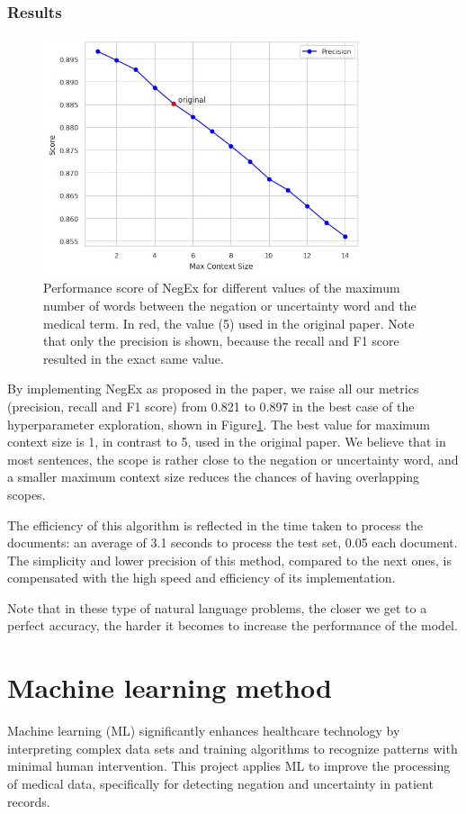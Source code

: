 \documentclass{article}
\begin{document}
\subsubsection*{Results}

\begin{figure}[!t]
	\centering
	\includegraphics[height=7cm]{images/negex_context_size.jpg}
	\captionsetup{width=0.9\textwidth}
	\caption{Performance score of NegEx for different values of the maximum number of words between the negation
	or uncertainty word and the medical term. In red, the value (5) used in the original paper. Note that only
	the precision is shown, because the recall and F1 score resulted in the exact same value.}
	\label{fig:negex_context_size}
\end{figure}

By implementing NegEx as proposed in the paper, we raise all our metrics (precision, recall and F1 score) from
0.821 to 0.897 in the best case of the hyperparameter exploration, shown in Figure\ref{fig:negex_context_size}.
The best value for maximum context size is 1, in contrast to 5, used in the original paper. We believe that in
most sentences, the scope is rather close to the negation or uncertainty word, and a smaller maximum context size
reduces the chances of having overlapping scopes.

The efficiency of this algorithm is reflected in the time taken to process the documents: an average of 3.1 seconds
to process the test set, 0.05 each document. The simplicity and lower precision of this method, compared to the
next ones, is compensated with the high speed and efficiency of its implementation.

Note that in these type of natural language problems, the closer we get to a perfect accuracy, the harder it becomes
to increase the performance of the model.

\section*{Machine learning method}
Machine learning (ML) significantly enhances healthcare technology by interpreting complex data sets and training
algorithms to recognize patterns with minimal human intervention. This project applies ML to improve the processing
of medical data, specifically for detecting negation and uncertainty in patient records. 
\end{document}
